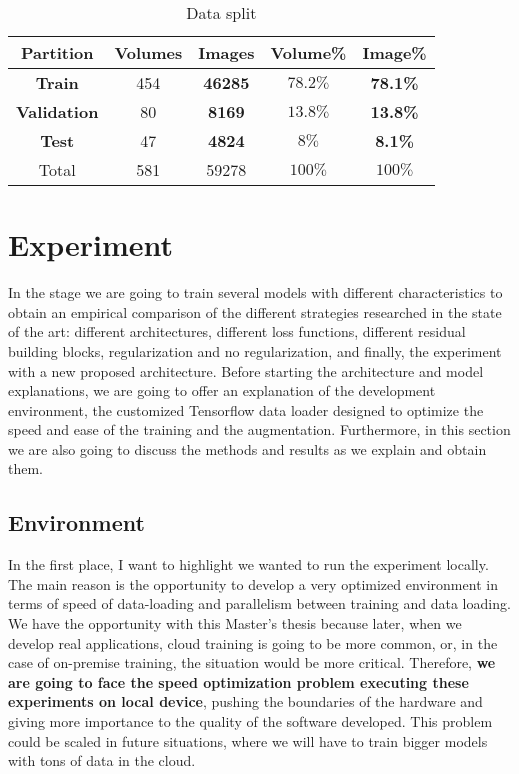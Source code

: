 \begin{table}[!ht]
  \begin{center}
   \setlength\extrarowheight{2pt} %
   \begin{tabular}{c c c c c}
    \toprule
    \textbf{Partition} & \textbf{Volumes} & \textbf{Images} & \textbf{Volume\%} & \textbf{Image\%}\\
    \hline   
    \textbf{Train}       & 454   & \textbf{46285}& $78.2\%$  & \textbf{78.1\%}       \\
    \textbf{Validation}  & 80    & \textbf{8169} & $13.8\%$  & \textbf{13.8\%}       \\
    \textbf{Test}        & 47    & \textbf{4824} & $8\%$     & \textbf{8.1\%}        \\
    \hline
    Total                & 581   & 59278        & $100\%$   & $100\%$               \\
    \bottomrule
    \end{tabular}
    \end{center}
    \caption{Data split}
    \label{table:datasplit}
\end{table}

\FloatBarrier
\newpage

\section{Experiment}

In the stage we are going to train several models with different characteristics to obtain an empirical comparison of the different strategies researched in the state of the art: different architectures, different loss functions, different residual building blocks, regularization and no regularization, and finally, the experiment with a new proposed architecture. Before starting the architecture and model explanations, we are going to offer an explanation of the development environment, the customized Tensorflow data loader designed to optimize the speed and ease of the training and the augmentation. Furthermore, in this section we are also going to discuss the methods and results as we explain and obtain them.

\subsection{Environment}

In the first place, I want to highlight we wanted to run the experiment locally. The main reason is the opportunity to develop a very optimized environment in terms of speed of data-loading and parallelism between training and data loading. We have the opportunity with this Master's thesis because later, when we develop real applications, cloud training is going to be more common, or, in the case of on-premise training, the situation would be more critical. Therefore, \textbf{we are going to face the speed optimization problem executing these experiments on local device}, pushing the boundaries of the hardware and giving more importance to the quality of the software developed. This problem could be scaled in future situations, where we will have to train bigger models with tons of data in the cloud.

